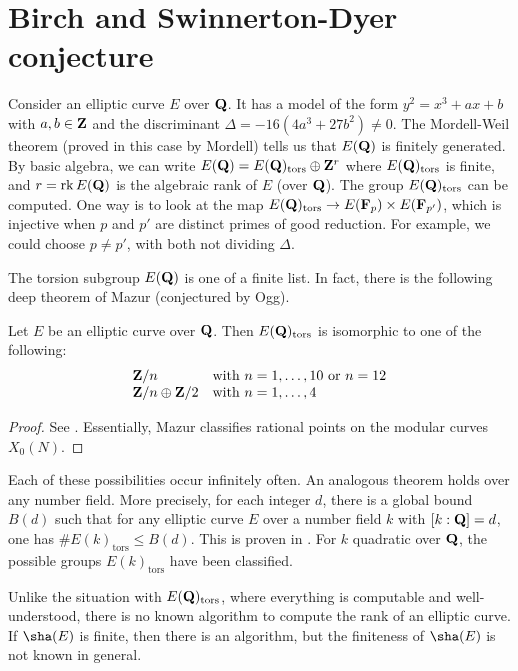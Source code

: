 




\section{Birch and Swinnerton-Dyer conjecture}

Consider an elliptic curve $E$ over $\mathbf{Q}$. It has a model of the form 
$y^2=x^3+a x+b$ with $a,b\in \mathbf{Z}$ and the discriminant 
$\Delta=-16(4 a^3+27 b^2)\ne 0$. The Mordell-Weil theorem (proved in this case 
by Mordell) tells us that $E(\mathbf{Q})$ is finitely generated. By basic algebra, 
we can write $E(\mathbf{Q}) = E(\mathbf{Q})_\text{tors}\oplus \mathbf{Z}^r$ where 
$E(\mathbf{Q})_\text{tors}$ is finite, and $r=\operatorname{rk} E(\mathbf{Q})$ is the algebraic rank of 
$E$ (over $\mathbf{Q}$). The group $E(\mathbf{Q})_\text{tors}$ can be computed. One way is to 
look at the map $E(\mathbf{Q})_\text{tors}\to E(\mathbf{F}_p)\times E(\mathbf{F}_{p'})$, which is 
injective when $p$ and $p'$ are distinct primes of good reduction. For 
example, we could choose $p\ne p'$, with both not dividing $\Delta$. 

The torsion subgroup $E(\mathbf{Q})$ is one of a finite list. In fact, there is the 
following deep theorem of Mazur (conjectured by Ogg).

\begin{theorem}
Let $E$ be an elliptic curve over $\mathbf{Q}$. Then $E(\mathbf{Q})_\textnormal{tors}$ is 
isomorphic to one of the following:
\[
  \begin{array}{ll}
    \mathbf{Z}/n & \text{with $n=1,\dots,10$ or $n=12$} \\
    \mathbf{Z}/n\oplus \mathbf{Z}/2 & \text{with $n=1,\dots,4$}
  \end{array}
\]
\end{theorem}
\begin{proof}
See \cite[III.5.1]{ma77}. Essentially, Mazur classifies rational points on the 
modular curves $X_0(N)$. 
\end{proof}

Each of these possibilities occur infinitely often. An analogous theorem holds 
over any number field. More precisely, for each integer $d$, there is a global 
bound $B(d)$ such that for any elliptic curve $E$ over a number field $k$ with 
$[k:\mathbf{Q}]=d$, one has $\# E(k)_\text{tors} \leqslant B(d)$. This is proven in 
\cite{me96}. For $k$ quadratic over $\mathbf{Q}$, the possible groups 
$E(k)_\text{tors}$ have been classified. 

Unlike the situation with $E(\mathbf{Q})_\text{tors}$, where everything is computable 
and well-understood, there is no known algorithm to compute the rank of an 
elliptic curve. If $\sha(E)$ is finite, then there is an algorithm, but the 
finiteness of $\sha(E)$ is not known in general. 

